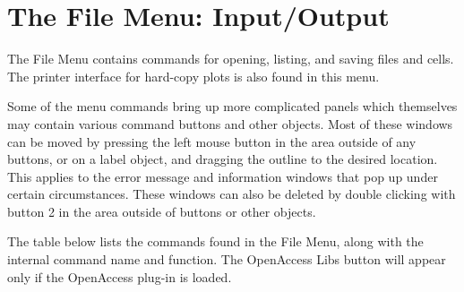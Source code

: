 
\chapter{The File Menu:  {\Xic} Input/Output}
The {\cb File Menu} contains commands for opening, listing, and saving
files and cells.  The printer interface for hard-copy plots is also
found in this menu.

Some of the menu commands bring up more complicated panels which
themselves may contain various command buttons and other objects. 
Most of these windows can be moved by pressing the left mouse button
in the area outside of any buttons, or on a label object, and dragging
the outline to the desired location.  This applies to the error
message and information windows that pop up under certain
circumstances.  These windows can also be deleted by double clicking
with button 2 in the area outside of buttons or other objects.

The table below lists the commands found in the {\cb File Menu}, along
with the internal command name and function.
The {\cb OpenAccess Libs} button will appear only if the OpenAccess
plug-in is loaded.

